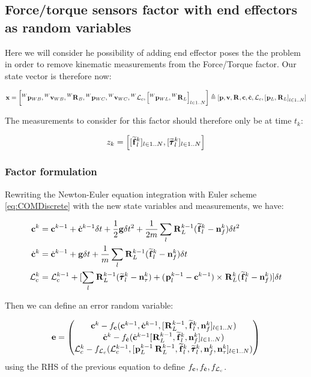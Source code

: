 \documentclass[11pt]{article}
\newcommand{\Rot}[2]{\prescript{#1}{}{\bfR}_{#2}}
\newcommand{\noise}{\bfn}
\newcommand{\posi}[2]{\prescript{#1}{}{\bfp}_{#2}}
\newcommand{\vel}[2]{\prescript{#1}{}{\bfv}_{#2}}
\newcommand{\forcem}[2]{\prescript{#1}{}{\widetilde{\bff}}_{#2}}
\newcommand{\torquem}[2]{\prescript{#1}{}{\widetilde{\pmb{\tau}}}_{#2}}
\newcommand{\AM}{\mathcal{L}}
\newcommand{\COM}{\bfc}
\newcommand{\COMd}{\dot{\bfc}}
\begin{document}
\subsection{Force/torque sensors factor with end effectors as random variables}
Here we will consider he possibility of adding end effector poses the the problem in order to remove kinematic measurements from the Force/Torque factor. Our state vector is therefore now:

\begin{equation*}
\bfx = \left[\posi{W}{WB}, \vel{W}{WB}, \Rot{W}{B}, \posi{W}{WC}, \vel{W}{WC}, \prescript{W}{}{\AM}_{c}, \left[\posi{W}{WL}, \Rot{W}{L}\right]_{l \in 1..N} \right] 
\triangleq 
[\bfp, \bfv, \Rot{}{}, \COM, \COMd, \AM_c, \left[\posi{}{L}, \Rot{}{L}\right]_{l \in 1..N} ] 
\end{equation*}

The measurements to consider for this factor should therefore only be at time $t_k$:

\begin{equation}
z_k = \left[[\forcem{}{l}^k]_{l \in 1..N}, [\torquem{}{l}^k]_{l \in 1..N} \right]
\end{equation}


\subsubsection{Factor formulation}
Rewriting the Newton-Euler equation integration with Euler scheme \ref{eq:COMDiscrete} with the new state variables and measurements, we have:

\begin{equation}
\begin{split}
\COM^{k} &= \COM^{k-1} + \COMd^{k-1} \delta t 
+ \frac{1}{2} \bfg \delta t^2 + \frac{1}{2m} \sum_l \Rot{}{L}^{k-1} (\forcem{}{l}^{k} - \noise_f^{k}) \delta t^2
\\
\COMd^{k}&= \COMd^{k-1} + \bfg \delta t + \frac{1}{m} \sum_l \Rot{}{L}^{k-1} (\forcem{}{l}^{k} - \noise_f^{k}) \delta t 
\\
\AM_c^{k} &= \AM_c^{k-1} +  [ 
\sum_l \Rot{}{L}^{k-1}(\torquem{}{l}^{k} - \noise_{\tau}^{k}) + (\posi{}{l}^{k-1} - \COM^{k-1}) \times \Rot{}{L}^{k}(\forcem{}{l}^{k} - \noise_f^{k}) 
] \delta t
\end{split}
\label{eq:COMDiscreteFeet}
\end{equation}

Then we can define an error random variable:

\begin{equation}
	\bfe =
	\begin{pmatrix}
	\COM^k - f_{\COM}(\COM^{k-1}, \COMd^{k-1}, [\Rot{}{L}^{k-1}, \forcem{}{l}^k, \noise_f^k]_{l \in 1..N})
	\\
	\COMd^k - f_{\COMd}(\COMd^{k-1} [\Rot{}{L}^{k-1}, \forcem{}{l}^k, \noise_f^k]_{l \in 1..N})
	\\
	\AM_c^k - f_{\AM_c}(\AM_c^{k-1}, [\posi{}{L}^{k-1} \Rot{}{L}^{k-1}, \forcem{}{l}^k, \torquem{}{l}^k, \noise_f^k, \noise_{\tau}^k]_{l \in 1..N})	
	\end{pmatrix}
\end{equation}
using the RHS of the previous equation to define $f_{\COM},f_{\COMd},f_{\AM_c}$.
\end{document}
